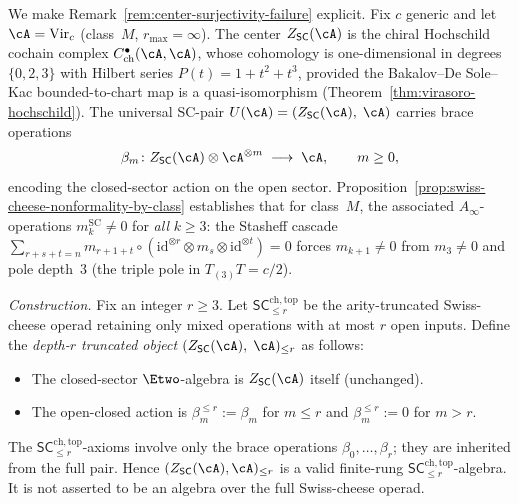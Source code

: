 \begin{example}
\label{ex:deficient-sc-pair-virasoro}

We make Remark~\ref{rem:center-surjectivity-failure} explicit.
Fix $c$ generic and let $\cA = \mathrm{Vir}_c$ (class~$M$,
$r_{\max} = \infty$). The center
$Z_{\mathsf{SC}}(\cA)$ is the chiral Hochschild cochain complex
$C^{\bullet}_{\mathrm{ch}}(\cA, \cA)$, whose cohomology is
one-dimensional in degrees~$\{0,2,3\}$ with Hilbert series
$P(t)=1+t^2+t^3$, provided the Bakalov--De Sole--Kac
bounded-to-chart map is a quasi-isomorphism
(Theorem~\ref{thm:virasoro-hochschild}). The universal SC-pair
$U(\cA) = (Z_{\mathsf{SC}}(\cA),\; \cA)$ carries brace
operations
\[
\beta_m \colon Z_{\mathsf{SC}}(\cA) \otimes \cA^{\otimes m}
\;\longrightarrow\; \cA, \qquad m \geq 0,
\]
encoding the closed-sector action on the open sector.
Proposition~\ref{prop:swiss-cheese-nonformality-by-class}
establishes that for class~$M$, the associated
$A_\infty$-operations $m_k^{\mathrm{SC}} \neq 0$ for
\emph{all} $k \geq 3$: the Stasheff cascade
$\sum_{r+s+t = n} m_{r+1+t} \circ
(\mathrm{id}^{\otimes r} \otimes m_s \otimes \mathrm{id}^{\otimes t})
= 0$
forces $m_{k+1} \neq 0$ from $m_3 \neq 0$ and pole depth~$3$
(the triple pole in $T_{(3)}T = c/2$).

\smallskip
\noindent\emph{Construction.}
Fix an integer $r \geq 3$. Let
$\mathsf{SC}^{\mathrm{ch,top}}_{\le r}$ be the arity-truncated
Swiss-cheese operad retaining only mixed operations with at most
$r$ open inputs. Define the \emph{depth-$r$ truncated object}
$(Z_{\mathsf{SC}}(\cA),\; \cA)_{\leq r}$ as follows:
\begin{itemize}[nosep]
\item The closed-sector $\Etwo$-algebra is $Z_{\mathsf{SC}}(\cA)$
 itself (unchanged).
\item The open-closed action is
 $\beta_m^{\leq r} := \beta_m$ for $m \leq r$ and
 $\beta_m^{\leq r} := 0$ for $m > r$.
\end{itemize}
The $\mathsf{SC}^{\mathrm{ch,top}}_{\le r}$-axioms involve only the
brace operations $\beta_0, \ldots, \beta_r$; they are inherited from
the full pair. Hence
$(Z_{\mathsf{SC}}(\cA), \cA)_{\leq r}$ is a valid finite-rung
$\mathsf{SC}^{\mathrm{ch,top}}_{\le r}$-algebra. It is not asserted
to be an algebra over the full Swiss-cheese operad.


\end{example}
